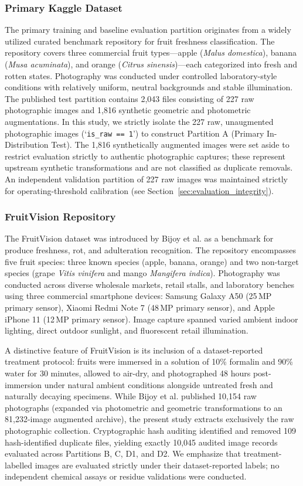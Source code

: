 \subsubsection{Primary Kaggle Dataset}
The primary training and baseline evaluation partition originates from a widely utilized curated benchmark repository for fruit freshness classification. The repository covers three commercial fruit types---apple (\textit{Malus domestica}), banana (\textit{Musa acuminata}), and orange (\textit{Citrus sinensis})---each categorized into fresh and rotten states. Photography was conducted under controlled laboratory-style conditions with relatively uniform, neutral backgrounds and stable illumination. The published test partition contains 2,043 files consisting of 227 raw photographic images and 1,816 synthetic geometric and photometric augmentations. In this study, we strictly isolate the 227 raw, unaugmented photographic images (`\texttt{is\_raw == 1}') to construct Partition A (Primary In-Distribution Test). The 1,816 synthetically augmented images were set aside to restrict evaluation strictly to authentic photographic captures; these represent upstream synthetic transformations and are not classified as duplicate removals. An independent validation partition of 227 raw images was maintained strictly for operating-threshold calibration (see Section~\ref{sec:evaluation_integrity}).

\subsubsection{FruitVision Repository}
The FruitVision dataset was introduced by Bijoy et al. \cite{bijoy2025fruitvision} as a benchmark for produce freshness, rot, and adulteration recognition. The repository encompasses five fruit species: three known species (apple, banana, orange) and two non-target species (grape \textit{Vitis vinifera} and mango \textit{Mangifera indica}). Photography was conducted across diverse wholesale markets, retail stalls, and laboratory benches using three commercial smartphone devices: Samsung Galaxy A50 (25\,MP primary sensor), Xiaomi Redmi Note 7 (48\,MP primary sensor), and Apple iPhone 11 (12\,MP primary sensor). Image capture spanned varied ambient indoor lighting, direct outdoor sunlight, and fluorescent retail illumination. 

A distinctive feature of FruitVision is its inclusion of a dataset-reported treatment protocol: fruits were immersed in a solution of 10\% formalin and 90\% water for 30 minutes, allowed to air-dry, and photographed 48 hours post-immersion under natural ambient conditions alongside untreated fresh and naturally decaying specimens. While Bijoy et al. published 10,154 raw photographs (expanded via photometric and geometric transformations to an 81,232-image augmented archive), the present study extracts exclusively the raw photographic collection. Cryptographic hash auditing identified and removed 109 hash-identified duplicate files, yielding exactly 10,045 audited image records evaluated across Partitions B, C, D1, and D2. We emphasize that treatment-labelled images are evaluated strictly under their dataset-reported labels; no independent chemical assays or residue validations were conducted.

